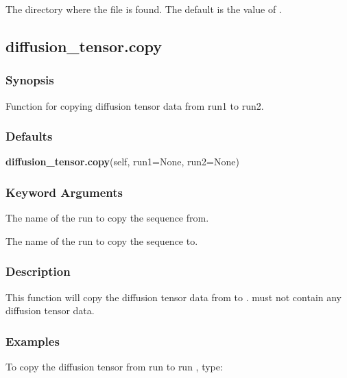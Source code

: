  The directory where the file  is found.  The default is the value of . 





\newpage

\subsection{diffusion\_tensor.copy}


\subsubsection{Synopsis}

Function for copying diffusion tensor data from run1 to run2.



\subsubsection{Defaults}

\textsf{\textbf{diffusion\_tensor.copy}(self, run1=None, run2=None)}


\subsubsection{Keyword Arguments}

  The name of the run to copy the sequence from. 

  The name of the run to copy the sequence to. 




\subsubsection{Description}

This function will copy the diffusion tensor data from  to .   must not contain any diffusion tensor data.



\subsubsection{Examples}

To copy the diffusion tensor from run  to run , type:


